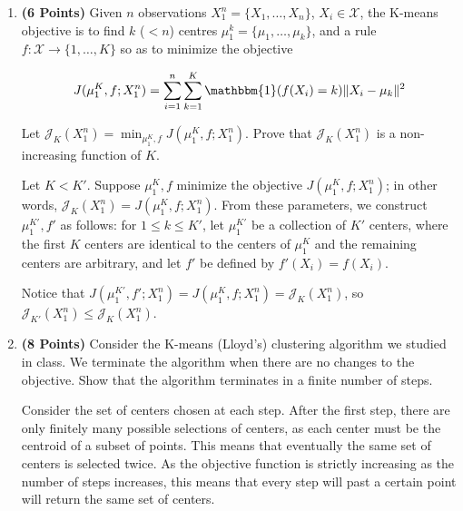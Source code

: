 \documentclass[a4paper]{article}
\newcounter{thm}
\newcommand{\Xcal}{\mathcal{X}}
\newcommand{\Jcal}{\mathcal{J}}
\newcommand{\indfone}{\mathbbm{1}}
\theoremstyle{definition}
\newenvironment{soln}{
    \leavevmode\color{blue}\ignorespaces
}{}
\begin{document}
\begin{enumerate}

\item \textbf{(6 Points)}
Given $n$ observations $X_1^n = \{X_1, \dots, X_n\}$, $X_i \in \Xcal$, the K-means objective
is to find $k$
($<n$) centres $\mu_1^k = \{\mu_1, \dots, \mu_k\}$, and a rule $f:\Xcal \rightarrow
\{1,\dots, K\}$ so as to minimize the objective

\begin{equation}
J(\mu_1^K, f; X_1^n) = \sum_{i=1}^n \sum_{k=1}^K \indfone(f(X_i) = k) \|X_i - \mu_k\|^2
\label{eqn:kmeans}
\end{equation}

Let $\Jcal_K(X_1^n) = \min_{\mu_1^K, f} J(\mu_1^K, f; X_1^n)$. Prove that
$\Jcal_{K}(X_1^n)$ is a non-increasing function of $K$.

\begin{soln}
  Let $K<K'$. Suppose $\mu_{1}^{K},f$ minimize the objective $J(\mu_{1}^{K},f;X_{1}^{n})$; in other words, $\Jcal_{K}(X_{1}^{n})=J(\mu_{1}^{K},f;X_{1}^{n})$. From these parameters, we construct $\mu_{1}^{K'}, f'$ as follows: for $1\le k\le K'$, let $\mu_{1}^{K'}$ be a collection of $K'$ centers, where the first $K$ centers are identical to the centers of $\mu_{1}^{K}$ and the remaining centers are arbitrary, and let $f'$ be defined by $f'(X_{i})=f(X_{i})$.

  Notice that $J(\mu_{1}^{K'},f';X_{1}^{n})=J(\mu_{1}^{K},f;X_{1}^{n})=\Jcal_{K}(X_{1}^{n})$, so $\Jcal_{K'}(X_{1}^{n})\le \Jcal_{K}(X_{1}^{n})$.
\end{soln}

\item \textbf{(8 Points)}
Consider the K-means (Lloyd's) clustering algorithm we studied in class. We
terminate the algorithm when there are no changes to the objective.
Show that the algorithm terminates in a finite number of steps.

\begin{soln}
  Consider the set of centers chosen at each step. After the first step, there are only finitely many possible selections of centers, as each center must be the centroid of a subset of points. This means that eventually the same set of centers is selected twice. As the objective function is strictly increasing as the number of steps increases, this means that every step will past a certain point will return the same set of centers.
\end{soln}

\end{enumerate}
\end{document}

